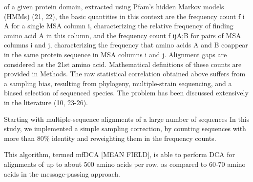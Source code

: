 

of a given protein domain, extracted using Pfam's hidden Markov models (HMMs) (21, 22), the basic quantities in this context are the frequency count f i A for a single MSA column i, characterizing the relative frequency of finding amino acid A in this column, and the frequency count f ijA;B for pairs of MSA columns i and j, characterizing the frequency that amino acids A and B coappear in the same protein sequence in MSA columns i and j. Alignment gaps are considered as the 21st amino acid. Mathematical definitions of these counts are provided in Methods. \cite{morcos2011direct}
The raw statistical correlation obtained above suffers from a sampling bias, resulting from phylogeny, multiple-strain sequencing, and a biased selection of sequenced species. The problem has been discussed extensively in the literature (10, 23-26). \cite{morcos2011direct}

Starting with multiple-sequence alignments of a large number of sequences In this study, we implemented a simple sampling correction, by counting sequences with more than 80\% identity and reweighting them in the frequency counts.  \cite{morcos2011direct}

This algorithm, termed mfDCA [MEAN FIELD], is able to perform DCA for alignments of up to about 500 amino acids per row, as compared to 60-70 amino acids in the message-passing approach.  \cite{morcos2011direct}

